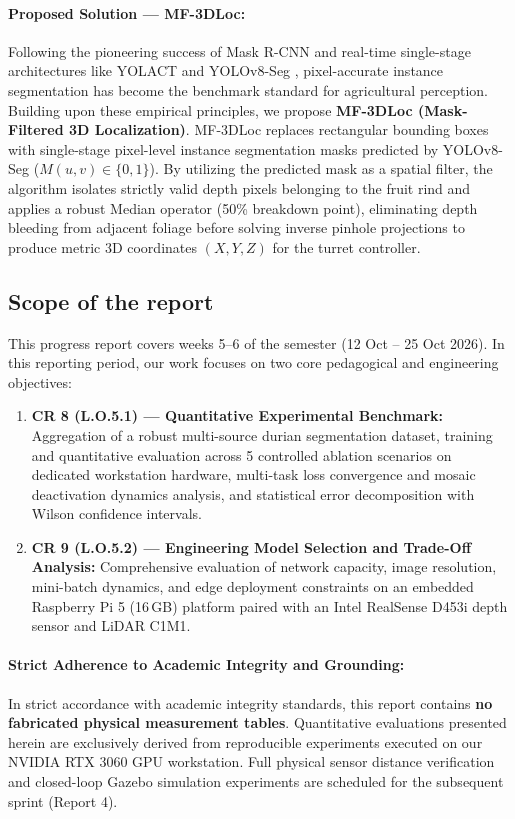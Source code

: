 \documentclass[12pt,a4paper]{article}
\begin{document}
\paragraph{Proposed Solution --- MF-3DLoc:}
Following the pioneering success of Mask R-CNN \cite{he2017maskrcnn} and real-time single-stage architectures like YOLACT \cite{bolya2019yolact} and YOLOv8-Seg \cite{ultralytics2023}, pixel-accurate instance segmentation has become the benchmark standard for agricultural perception. Building upon these empirical principles, we propose \textbf{MF-3DLoc (Mask-Filtered 3D Localization)}. MF-3DLoc replaces rectangular bounding boxes with single-stage pixel-level instance segmentation masks predicted by YOLOv8-Seg \cite{ultralytics2023} ($M(u, v) \in \{0, 1\}$). By utilizing the predicted mask as a spatial filter, the algorithm isolates strictly valid depth pixels belonging to the fruit rind and applies a robust Median operator (50\% breakdown point), eliminating depth bleeding from adjacent foliage before solving inverse pinhole projections to produce metric 3D coordinates $(X, Y, Z)$ for the turret controller.
\subsection{Scope of the report}
This progress report covers weeks 5--6 of the semester (12 Oct -- 25 Oct 2026). In this reporting period, our work focuses on two core pedagogical and engineering objectives:
\begin{enumerate}
    \item \textbf{C\DJ R 8 (L.O.5.1) --- Quantitative Experimental Benchmark:} Aggregation of a robust multi-source durian segmentation dataset, training and quantitative evaluation across 5 controlled ablation scenarios on dedicated workstation hardware, multi-task loss convergence and mosaic deactivation dynamics analysis, and statistical error decomposition with Wilson confidence intervals.
    \item \textbf{C\DJ R 9 (L.O.5.2) --- Engineering Model Selection and Trade-Off Analysis:} Comprehensive evaluation of network capacity, image resolution, mini-batch dynamics, and edge deployment constraints on an embedded Raspberry Pi 5 (16\,GB) platform paired with an Intel RealSense D453i depth sensor and LiDAR C1M1.
\end{enumerate}

\paragraph{Strict Adherence to Academic Integrity and Grounding:}
In strict accordance with academic integrity standards, this report contains \textbf{no fabricated physical measurement tables}. Quantitative evaluations presented herein are exclusively derived from reproducible experiments executed on our NVIDIA RTX 3060 GPU workstation. Full physical sensor distance verification and closed-loop Gazebo simulation experiments are scheduled for the subsequent sprint (Report 4).
\end{document}
